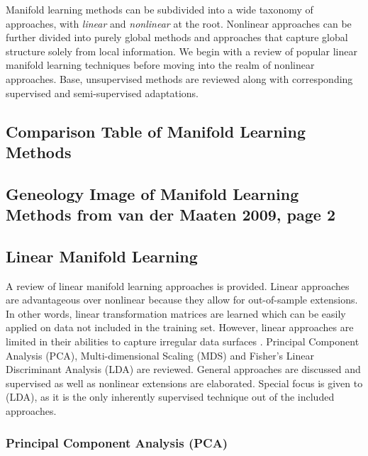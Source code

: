 Manifold learning methods can be subdivided into a wide taxonomy of approaches, with \textit{linear} and \textit{nonlinear} at the root. Nonlinear approaches can be further divided into purely global methods and approaches that capture global structure solely from local information.  We begin with a review of popular linear manifold learning techniques before moving into the realm of nonlinear approaches. Base, unsupervised methods are reviewed along with corresponding supervised and semi-supervised adaptations. 

\subsection{Comparison Table of Manifold Learning Methods}
\subsection{Geneology Image of Manifold Learning Methods from van der Maaten 2009, page  2}

\subsection{Linear Manifold Learning}
A review of linear manifold learning approaches is provided.  Linear approaches are advantageous over nonlinear because they allow for out-of-sample extensions.  In other words, linear transformation matrices are learned which can be easily applied on data not included in the training set.  However, linear approaches are limited in their abilities to capture irregular data surfaces \citep{Kegl2008PrincipalManifoldsTextbook}.  Principal Component Analysis (PCA), Multi-dimensional Scaling (MDS) and Fisher's Linear Discriminant Analysis (LDA) are reviewed.  General approaches are discussed and supervised as well as nonlinear extensions are elaborated. Special focus is given to (LDA), as it is the only inherently supervised technique out of the included approaches.

\subsubsection{Principal Component Analysis (PCA)}

